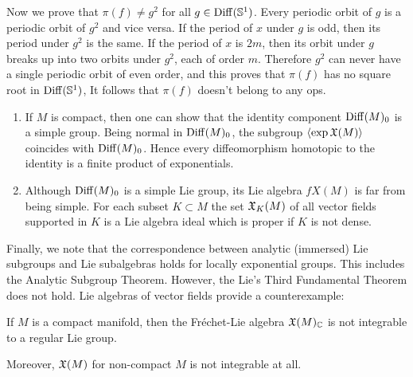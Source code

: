 \begin{example}
    Now we prove that $\pi(f)\neq g^2$ for all $g\in\operatorname{Diff}(\mathbb{S}^1)$. Every periodic orbit of $g$ is a periodic  orbit of $g^2$ and vice versa. If the period of $x$ under $g$ is odd, then its period under $g^2$ is the same. If the period of $x$ is $2m$, then its orbit under $g$ breaks up into two orbits under $g^2$, each of order $m$. Therefore $g^2$ can never have a single periodic orbit of even order, and this proves that $\pi(f)$ has no square root in $\operatorname{Diff}(\mathbb{S}^1)$, It follows that $\pi(f)$ doesn't belong to any \gls{ops}.
\end{example}

\begin{rem}
    \begin{enumerate}[label=(\alph*)]
        \item If $M$ is compact, then one can show that the identity component $\operatorname{Diff}(M)_0$ is a simple group. Being normal in $\operatorname{Diff}(M)_0$, the subgroup $\langle\exp\mathfrak{X}(M)\rangle$ coincides with $\operatorname{Diff}(M)_0$. Hence every diffeomorphism homotopic to the identity is a finite product of exponentials.
        \item  Although $\operatorname{Diff}(M)_0$ is a simple Lie group, its Lie algebra $fX(M)$ is far from being simple. For each subset $K\subset M$ the set $\mathfrak{X}_K(M)$ of all vector fields supported in $K$ is a Lie algebra ideal which is proper if $K$ is not dense.
    \end{enumerate}
\end{rem}

Finally, we note that the correspondence between analytic (immersed) Lie subgroups and Lie subalgebras holds for locally exponential groups. This includes the Analytic Subgroup Theorem. However, the Lie's Third Fundamental Theorem does not hold. Lie algebras of vector fields provide a counterexample:
\begin{thm}[Lempert]
    If $M$ is a compact manifold, then the Fr\'echet-Lie algebra $\mathfrak{X}(M)_{\mathbb{C}}$ is not integrable to a regular Lie group.
\end{thm}
Moreover, $\mathfrak{X}(M)$ for non-compact $M$ is not integrable at all.


